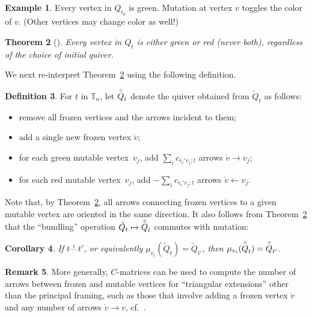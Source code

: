 \documentclass[11pt, letterpaper]{amsart}
\newtheorem{theorem}{Theorem}[section]
\newtheorem{corollary}[theorem]{Corollary}
\theoremstyle{definition}
\newtheorem{remark}[theorem]{Remark}
\newtheorem{example}[theorem]{Example}
\newtheorem{definition}[theorem]{Definition}
\numberwithin{equation}{section}
\newcommand{\boxQ}{\overset{\hspace*{0.4pt}\scalebox{0.4}{$\bm{\Box}$}}{Q}} %
\begin{document}
\begin{example}
Every vertex in $Q_{t_0}$ is green.
Mutation at vertex $v$ toggles the color of $v$. 
(Other vertices may change color as well!)
\end{example}

\begin{theorem}[{\cite{QPs2signcoherence}}]
\label{thm:sign coherence}
Every vertex in $Q_t$ is either green or red (never both), regardless of the choice of initial quiver.
\end{theorem}

We next re-interpret Theorem~\ref{thm:sign coherence} using the following definition. 

\begin{definition}
\label{def:boxQ}
For  $t$ in $\mathbb T_n$, let $\boxQ_t$ denote the quiver obtained from $\tilde Q_t$ as follows: 
\begin{itemize}[leftmargin=.2in]
\item 
remove all frozen vertices and the arrows incident to them; 
\item
add a single new frozen vertex $\mathring v$; 
\item 
for each green mutable vertex~$v_j$, 
add $\sum_{i} c_{v_i' v_j; t}$ arrows  $\mathring{v} \rightarrow v_j$; 
\item
for each red mutable vertex~$v_j$, add $-\sum_{i} c_{v_i' v_j; t}$ arrows  $\mathring{v} \leftarrow v_j$.
\end{itemize}
\end{definition}

Note that, by Theorem~\ref{thm:sign coherence}, all arrows connecting frozen vertices to a given mutable vertex 
are oriented in the same direction. 
It also follows from Theorem~\ref{thm:sign coherence} that the ``bundling'' operation $\tilde Q_t \mapsto \boxQ_t$   
commutes with mutation: 

\begin{corollary}%
\label{cor:Cmats and gluing}
If $t \stackrel{i}{\text{---}} t'$, or equivalently $\mu_{v_i}(\tilde Q_t)=\tilde Q_{t'}$, then 
 $\mu_{v_i}(\boxQ_t) = \boxQ_{t'}$.
\end{corollary}

\begin{remark} 
More generally, $C$-matrices can be used to compute the number of arrows between frozen and mutable vertices 
for  ``triangular extensions'' other than the principal framing,  
such as those that involve adding a frozen vertex $\mathring{v}$ and 
any number of arrows $\mathring{v} \rightarrow v$, cf.\ \cite[Theorem~3.2]{CaoLiCmats}.
\end{remark}
\end{document}
